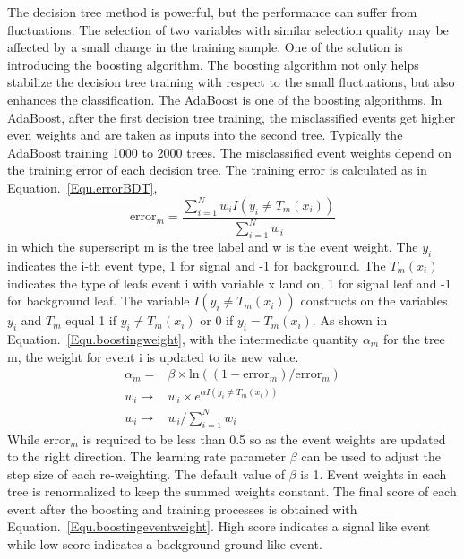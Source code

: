 The decision tree method is powerful, but the performance can suffer from fluctuations. The selection of two variables with similar selection quality may be affected by a small change in the training sample. One of the solution is introducing the boosting algorithm. The boosting algorithm not only helps stabilize the decision tree training with respect to the small fluctuations, but also enhances the classification. The AdaBoost is one of the boosting algorithms. In AdaBoost, after the first decision tree training, the misclassified events get higher even weights and are taken as inputs into the second tree. Typically the AdaBoost training 1000 to 2000 trees. The misclassified event weights depend on the training error of each decision tree. The training error is calculated as in Equation.~\ref{Equ.errorBDT},
\begin{equation}\label{Equ.errorBDT} 
\textrm{error}_{m}=\frac{\sum_{i=1}^{N}w_{i}I(y_{i}\neq T_{m}(x_{i}))}{\sum_{i=1}^{N}w_{i}} 
\end{equation}
in which the superscript m is the tree label and w is the event weight. The $y_{i}$ indicates the i-th event type, 1 for signal and -1 for background. The $T_{m}(x_{i})$ indicates the type of leafs event i with variable x land on, 1 for signal leaf and -1 for background leaf. The variable $I(y_{i}\neq T_{m}(x_{i}))$ constructs on the variables $y_{i}$ and $T_{m}$ equal 1 if $y_{i}\neq T_{m}(x_{i})$ or 0 if $y_{i}= T_{m}(x_{i})$. As shown in Equation.~\ref{Equ.boostingweight}, with the intermediate quantity $\alpha_{m}$ for the tree m, the weight for event i is updated to its new value. 
\begin{align}\label{Equ.boostingweight} 
\alpha_{m}=&\beta\times \textrm{ln}((1-\textrm{error}_{m})/\textrm{error}_{m})\\
w_{i}\rightarrow &w_{i}\times e^{\alpha I(y_{i}\neq T_{m}(x_{i}))} \\
w_{i}\rightarrow &w_{i}/\sum_{i=1}^{N}w_{i}
\end{align}
While $\textrm{error}_{m}$ is required to be less than 0.5 so as the event weights are updated to the right direction. The learning rate parameter $\beta$ can be used to adjust the step size of each re-weighting. The default value of $\beta$ is 1. Event weights in each tree is renormalized to keep the summed weights constant. The final score of each event after the boosting and training processes is obtained with Equation.~\ref{Equ.boostingeventweight}. High score indicates a signal like event while low score indicates a background ground like event.






